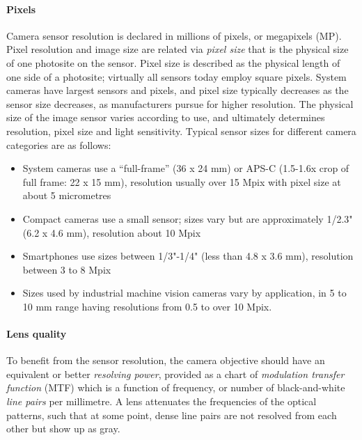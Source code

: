 
\paragraph{Pixels}
Camera sensor resolution is declared in millions of pixels, or megapixels (MP).
Pixel resolution and image size are related via \emph{pixel size} that is the physical size of one photosite on the sensor.
Pixel size is described as the physical length of one side of a photosite; virtually all sensors today employ square pixels.
System cameras have largest sensors and pixels, and pixel size typically decreases as the sensor size decreases, as manufacturers pursue for higher resolution.
The physical size of the image sensor varies according to use, and ultimately determines resolution, pixel size and light sensitivity.
Typical sensor sizes for different camera categories are as follows:

\begin{itemize}
	\item System cameras use a ``full-frame'' (36 x 24 mm) or APS-C (1.5-1.6x crop of full frame: 22 x 15 mm), resolution usually over 15 Mpix with pixel size at about 5 micrometres
	\item Compact cameras use a small sensor; sizes vary but are approximately 1/2.3" (6.2 x 4.6 mm), resolution about 10 Mpix
	\item Smartphones use sizes between 1/3"-1/4" (less than 4.8 x 3.6 mm), resolution between 3 to 8 Mpix
	\item Sizes used by industrial machine vision cameras vary by application, in 5 to 10 mm range having resolutions from 0.5 to over 10 Mpix.
\end{itemize}



\paragraph{Lens quality}
To benefit from the sensor resolution, the camera objective should have an equivalent or better \emph{resolving power}, provided as a chart of \emph{modulation transfer function} (MTF) which is a function of frequency, or number of black-and-white \emph{line pairs} per millimetre.
A lens attenuates the frequencies of the optical patterns, such that at some point, dense line pairs are not resolved from each other but show up as gray.
\cite{nakamura2005image} \cite[p. 71]{kingslake1992optics}

